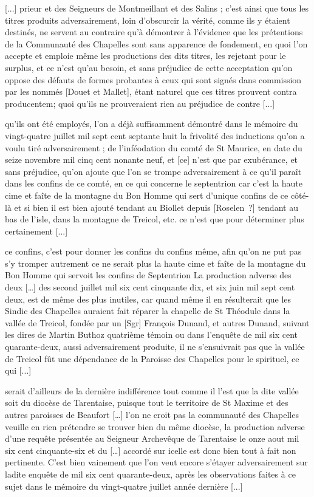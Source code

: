 \documentclass[a4paper,twoside,openany]{article}
\begin{document}

[...] prieur et des Seigneurs de Montmeillant et des Salins ; c'est ainsi que tous les titres produits adversairement, loin d'obscurcir la vérité, comme ils y étaient destinés, ne servent au contraire qu'à démontrer à l'évidence que les prétentions de la Communauté des Chapelles sont sans apparence de fondement, en quoi l'on accepte et emploie même les productions des dits titres, les rejetant pour le surplus, et ce n'est qu'au besoin, et sans préjudice de cette acceptation qu'on oppose des défauts de formes probantes à ceux qui sont signés dans commission par les nommés [Douet et Mallet], étant naturel que ces titres prouvent contra producentem; quoi qu'ils ne prouveraient rien au préjudice de contre [...]

qu’ils ont été employés, l'on a déjà suffisamment démontré dans le mémoire du vingt-quatre juillet mil sept cent septante huit la frivolité des inductions qu’on a voulu tiré adversairement ; de l’inféodation du comté de St Maurice, en date du seize novembre mil cinq cent nonante neuf, et [ce] n’est que par exubérance, et sans préjudice, qu'on ajoute que l'on se trompe adversairement à ce qu'il paraît dans les confins de ce comté, en ce qui concerne le septentrion car c'est la haute cime et faîte de la montagne du Bon Homme qui sert d'unique confins de ce côté-là et si bien il est bien ajouté tendant au Biollet depuis [Roselen~?] tendant au bas de l'isle, dans la montagne de Treicol, etc. ce n'est que pour déterminer plus certainement [...]


ce confins, c'est pour donner les confins du confins même, afin qu'on ne put pas s’y tromper autrement ce ne serait plus la haute cime et faîte de la montagne du Bon Homme qui servoit les confins de Septentrion
La production adverse des deux […] des second juillet mil six cent cinquante dix, et six juin mil sept cent deux, est de même des plus inutiles, car quand même il en résulterait que les Sindic des Chapelles auraient fait réparer la chapelle de St Théodule dans la vallée de Treicol, fondée par un [Sgr] François Dunand, et autres Dunand, suivant les dires de Martin  Buthoz quatrième témoin ou dans l'enquête de mil six cent quarante-deux, aussi adversairement produite, il ne s'ensuivrait pas que la vallée de Treicol fût une dépendance de la Paroisse des Chapelles pour le spirituel, ce qui [...]

serait d'ailleurs de la dernière indifférence tout comme il l’est que la dite vallée soit du diocèse de Tarentaise, puisque tout le territoire de St Maxime et des autres paroisses de Beaufort […] l’on ne croit pas la communauté des Chapelles veuille en rien prétendre se trouver bien du même diocèse, la production adverse d'une requête présentée au Seigneur Archevêque de Tarentaise le onze aout mil six cent cinquante-six et du […] accordé sur icelle est donc bien tout à fait non pertinente.
C'est bien vainement que l'on veut encore s'étayer adversairement sur ladite enquête de mil six cent quarante-deux, après les observations faites à ce sujet dans le mémoire du vingt-quatre juillet année dernière [...]
\end{document}
